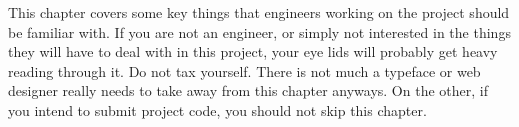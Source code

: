 

This chapter covers some key things that engineers working on the project should be familiar with. If you are not an engineer, or simply not interested in the things they will have to deal with in this project, your eye lids will probably get heavy reading through it. Do not tax yourself. There is not much a typeface or web designer really needs to take away from this chapter anyways. On the other, if you intend to submit project code, you should not skip this chapter.






\StopChapter

